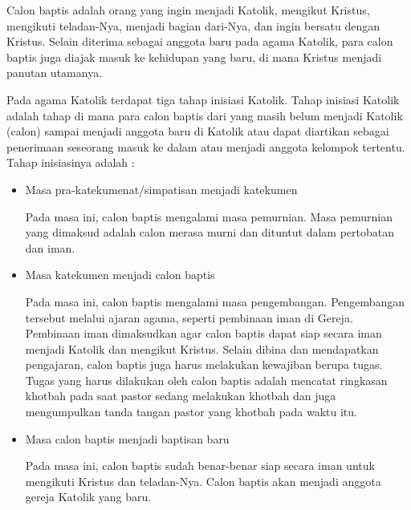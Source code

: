\documentclass[a4paper,twoside]{article}
\begin{document}
\begin{enumerate}
	
	Calon baptis adalah orang yang ingin menjadi Katolik, mengikut Kristus, mengikuti teladan-Nya, menjadi bagian dari-Nya, dan ingin bersatu dengan Kristus. Selain diterima sebagai anggota baru pada agama Katolik, para calon baptis juga diajak masuk ke kehidupan yang baru, di mana Kristus menjadi panutan utamanya. 
		
	
	Pada agama Katolik terdapat tiga tahap inisiasi Katolik. Tahap inisiasi Katolik adalah tahap di mana para calon baptis dari yang masih belum menjadi Katolik (calon) sampai menjadi anggota baru di Katolik atau dapat diartikan sebagai penerimaan seseorang masuk ke dalam atau menjadi anggota kelompok tertentu. Tahap inisiasinya adalah \cite{cbaptis}:
	
	\begin{itemize}
		\item Masa pra-katekumenat/simpatisan menjadi katekumen
		
			Pada masa ini, calon baptis mengalami masa pemurnian. Masa pemurnian yang dimaksud adalah calon merasa murni dan dituntut dalam pertobatan dan iman.
		\item Masa katekumen menjadi calon baptis
		
		Pada masa ini, calon baptis mengalami masa pengembangan. Pengembangan tersebut melalui ajaran agama, seperti pembinaan iman di Gereja. Pembinaan iman dimaksudkan agar calon baptis dapat siap secara iman menjadi Katolik dan mengikut Kristus. Selain dibina dan mendapatkan pengajaran, calon baptis juga harus melakukan kewajiban berupa tugas. Tugas yang harus dilakukan oleh calon baptis adalah mencatat ringkasan khotbah pada saat pastor sedang melakukan khotbah dan juga mengumpulkan tanda tangan pastor yang khotbah pada waktu itu.
		\item Masa calon baptis menjadi baptisan baru
		
		Pada masa ini, calon baptis sudah benar-benar siap secara iman untuk mengikuti Kristus dan teladan-Nya. Calon baptis akan menjadi anggota gereja Katolik yang baru.
	\end{itemize}


	

\end{enumerate}
\end{document}
